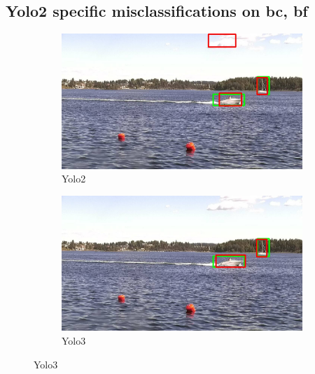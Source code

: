 \subsection{Yolo2 specific misclassifications on bc, bf}
\label{sec:yolo2_spec_misc}
\begin{figure}[h!]
\begin{subfigure}{.5\textwidth}
  \centering
  \includegraphics[width=0.9\linewidth]{results/case_buildings/yolo23/grove/yolo2/selected_06_25_frame0357.jpg}
  \caption{Yolo2}
\end{subfigure}%
\begin{subfigure}{.5\textwidth}
  \centering
  \includegraphics[width=.9\linewidth]{results/case_buildings/yolo23/grove/yolo3/selected_06_25_frame0357.jpg}
  \caption{Yolo3}
\end{subfigure}


\end{figure}
